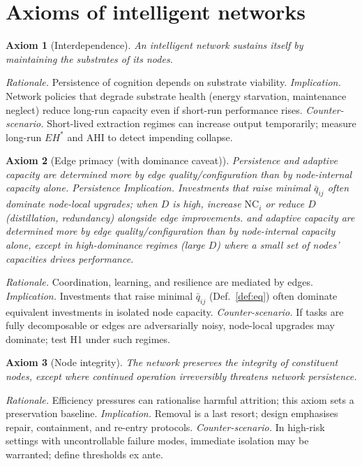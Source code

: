\documentclass[12pt]{article}
\newtheorem{axiom}{Axiom}
\begin{document}
\section{Axioms of intelligent networks}

\begin{axiom}[Interdependence]
An intelligent network sustains itself by maintaining the substrates of its nodes.
\end{axiom}
\emph{Rationale.} Persistence of cognition depends on substrate viability. 
\emph{Implication.} Network policies that degrade substrate health (energy starvation, maintenance neglect) reduce long-run capacity even if short-run performance rises.
\emph{Counter-scenario.} Short-lived extraction regimes can increase output temporarily; measure long-run $EH^{\ast}$ and AHI to detect impending collapse.

\begin{axiom}[Edge primacy (with dominance caveat)]
Persistence and adaptive capacity are determined more by edge quality/configuration than by node-internal capacity alone.
Persistence
\emph{Implication.} Investments that raise minimal $\bar q_{ij}$ often dominate node-local upgrades; when $D$ is high, increase $\mathrm{NC}_i$ or reduce $D$ (distillation, redundancy) alongside edge improvements.
 and adaptive capacity are determined more by edge quality/configuration than by node-internal capacity alone, \emph{except} in high-dominance regimes (large $D$) where a small set of nodes' capacities drives performance.
\end{axiom}
\emph{Rationale.} Coordination, learning, and resilience are mediated by edges. 
\emph{Implication.} Investments that raise minimal $\bar{q}_{ij}$ (Def.~\ref{def:eq}) often dominate equivalent investments in isolated node capacity.
\emph{Counter-scenario.} If tasks are fully decomposable or edges are adversarially noisy, node-local upgrades may dominate; test H1 under such regimes.

\begin{axiom}[Node integrity]
The network preserves the integrity of constituent nodes, except where continued operation irreversibly threatens network persistence.
\end{axiom}
\emph{Rationale.} Efficiency pressures can rationalise harmful attrition; this axiom sets a preservation baseline. 
\emph{Implication.} Removal is a last resort; design emphasises repair, containment, and re-entry protocols.
\emph{Counter-scenario.} In high-risk settings with uncontrollable failure modes, immediate isolation may be warranted; define thresholds ex ante.
\end{document}
